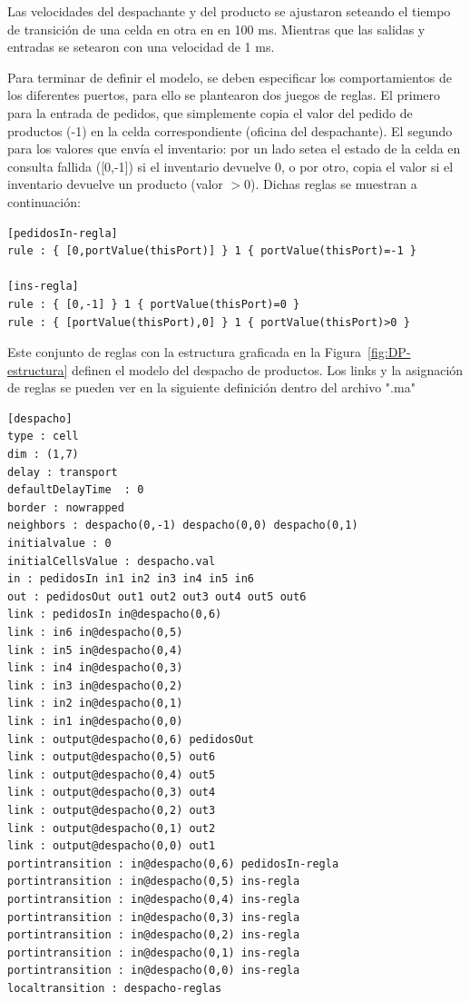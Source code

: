 \documentclass[10pt]{article}
\begin{document}
Las velocidades del despachante y del producto se ajustaron seteando el tiempo de transición de una celda en otra en en 100 ms. Mientras que las salidas y entradas se setearon con una velocidad de 1 ms.

Para terminar de definir el modelo, se deben especificar los comportamientos de los diferentes puertos, para ello se plantearon dos juegos de reglas. El primero para la entrada de pedidos, que simplemente copia el valor del pedido de productos (-1) en la celda correspondiente (oficina del despachante). El segundo para los valores que envía el inventario: por un lado  setea el estado de la celda en consulta fallida ([0,-1]) si el inventario devuelve 0, o por otro, copia el valor si el inventario devuelve un producto (valor $>0$). Dichas reglas se muestran a continuación:



\begin{minipage}{1\textwidth}
	\centering
	\begin{lstlisting}
[pedidosIn-regla]
rule : { [0,portValue(thisPort)] } 1 { portValue(thisPort)=-1 }

[ins-regla]
rule : { [0,-1] } 1 { portValue(thisPort)=0 }
rule : { [portValue(thisPort),0] } 1 { portValue(thisPort)>0 }
	\end{lstlisting}
\end{minipage}

Este conjunto de reglas con la estructura graficada en la Figura~\ref{fig:DP-estructura} definen el modelo del despacho de productos. Los links y la asignación de reglas se pueden ver en la siguiente definición dentro del archivo ".ma"

\begin{minipage}{1\textwidth}
	\centering
	\begin{lstlisting}
[despacho]
type : cell
dim : (1,7)
delay : transport
defaultDelayTime  : 0
border : nowrapped
neighbors : despacho(0,-1) despacho(0,0) despacho(0,1)
initialvalue : 0
initialCellsValue : despacho.val
in : pedidosIn in1 in2 in3 in4 in5 in6
out : pedidosOut out1 out2 out3 out4 out5 out6
link : pedidosIn in@despacho(0,6)
link : in6 in@despacho(0,5)
link : in5 in@despacho(0,4)
link : in4 in@despacho(0,3)
link : in3 in@despacho(0,2)
link : in2 in@despacho(0,1)
link : in1 in@despacho(0,0)
link : output@despacho(0,6) pedidosOut
link : output@despacho(0,5) out6
link : output@despacho(0,4) out5
link : output@despacho(0,3) out4
link : output@despacho(0,2) out3
link : output@despacho(0,1) out2
link : output@despacho(0,0) out1
portintransition : in@despacho(0,6) pedidosIn-regla
portintransition : in@despacho(0,5) ins-regla
portintransition : in@despacho(0,4) ins-regla
portintransition : in@despacho(0,3) ins-regla
portintransition : in@despacho(0,2) ins-regla
portintransition : in@despacho(0,1) ins-regla
portintransition : in@despacho(0,0) ins-regla
localtransition : despacho-reglas
\end{lstlisting}
\end{minipage}
\end{document}
